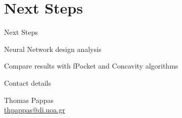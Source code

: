 \documentclass{beamer}
\begin{document}
\section{Next Steps}

\begin{frame}{Next Steps}
  \begin{block}{Neural Network design analysis}
  \end{block}
  \begin{block}{Compare results with fPocket and Concavity algorithms}
  \end{block}
\end{frame}

\begin{frame}{Contact details}
  \begin{center}
    Thomas Pappas\\
    \href{mailto:thpappas@di.uoa.gr}{thpappas@di.uoa.gr}
  \end{center}
\end{frame}
\end{document}
